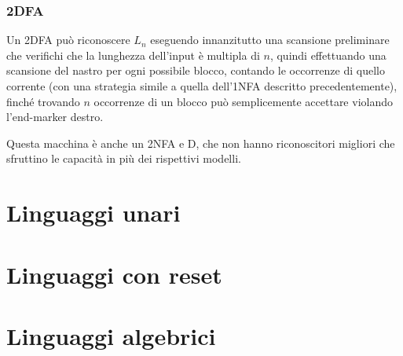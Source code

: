 \subsubsection{2DFA}
Un 2DFA può riconoscere $L_n$ eseguendo innanzitutto una scansione preliminare che verifichi che la lunghezza dell'input è multipla di $n$, quindi effettuando una scansione del nastro per ogni possibile blocco, contando le occorrenze di quello corrente (con una strategia simile a quella dell'1NFA descritto precedentemente), finché trovando $n$ occorrenze di un blocco può semplicemente accettare violando l'end-marker destro.

Questa macchina è anche un 2NFA e D, che non hanno riconoscitori migliori che sfruttino le capacità in più dei rispettivi modelli.



\section{Linguaggi unari}



\section{Linguaggi con reset}



\section{Linguaggi algebrici}
